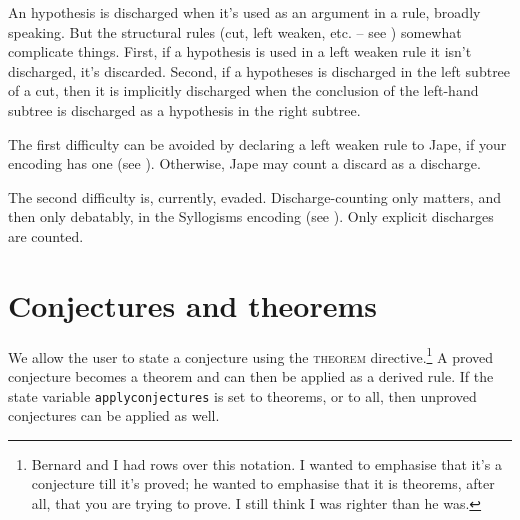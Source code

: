 An hypothesis is discharged when it's used as an argument in a rule, broadly speaking. But the structural rules (cut, left weaken, etc. -- see ) somewhat complicate things. First, if a hypothesis is used in a left weaken rule it isn't discharged, it's discarded. Second, if a hypotheses is discharged in the left subtree of a cut, then it is implicitly discharged when the conclusion of the left-hand subtree is discharged as a hypothesis in the right subtree.

The first difficulty can be avoided by declaring a left weaken rule to Jape, if your encoding has one (see ). Otherwise, Jape may count a discard as a discharge.

The second difficulty is, currently, evaded. Discharge-counting only matters, and then only debatably, in the Syllogisms encoding (see ). Only explicit discharges are counted.

\section{Conjectures and theorems}

We allow the user to state a conjecture using the \textsc{theorem} directive.\footnote{Bernard and I had rows over this notation. I wanted to emphasise that it's a conjecture till it's proved; he wanted to emphasise that it is theorems, after all, that you are trying to prove. I still think I was righter than he was.} A proved conjecture becomes a theorem and can then be applied as a derived rule. If the state variable \texttt{applyconjectures} is set to theorems, or to all, then unproved conjectures can be applied as well.

